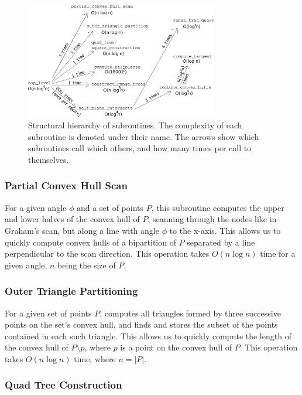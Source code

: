\documentclass{article}
\begin{document}
\begin{figure}[ht]
    \centering
    \includegraphics[width=0.75\textwidth]{hierarchy.png}
    \caption{Structural hierarchy of subroutines. The complexity of each subroutine is denoted under their name. The arrows show which subroutines call which others, and how many times per call to themselves.}
    \label{fig:hierarchy}
\end{figure}

\subsubsection{Partial Convex Hull Scan}

For a given angle $\phi$ and a set of points $P$, this subroutine computes the upper and lower halves of the convex hull of $P$, scanning through the nodes like in Graham's scan, but along a line with angle $\phi$ to the x-axis. This allows us to quickly compute convex hulls of a bipartition of $P$ separated by a line perpendicular to the scan direction. This operation takes $O(n \log n)$ time for a given angle, $n$ being the size of $P$.

\subsubsection{Outer Triangle Partitioning} \label{subsub:outer_triangle_partitioning}

For a given set of points $P$, computes all triangles formed by three successive points on the set's convex hull, and finds and stores the subset of the points contained in each such triangle. This allows us to quickly compute the length of the convex hull of $P \setminus {p}$, where $p$ is a point on the convex hull of $P$. This operation takes $O(n \log n)$ time, where $n = |P|$.
    
\subsubsection{Quad Tree Construction} 
\end{document}
